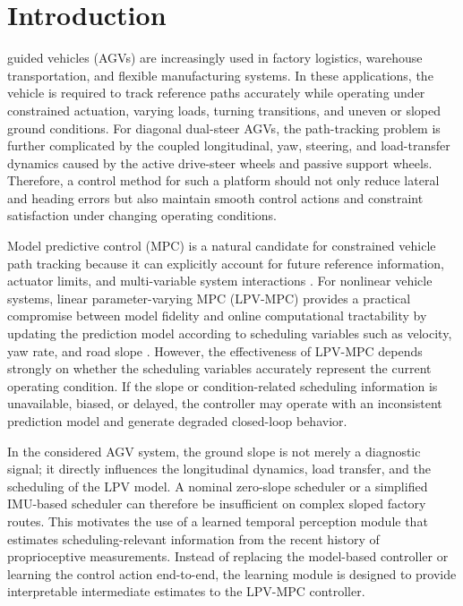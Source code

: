 \documentclass{ieeeaccess}
\begin{document}
\titlepgskip=-15pt
\maketitle

\section{Introduction}

\label{sec:introduction}

 guided vehicles (AGVs) are increasingly used in factory logistics, warehouse transportation, and flexible manufacturing systems. In these applications, the vehicle is required to track reference paths accurately while operating under constrained actuation, varying loads, turning transitions, and uneven or sloped ground conditions. For diagonal dual-steer AGVs, the path-tracking problem is further complicated by the coupled longitudinal, yaw, steering, and load-transfer dynamics caused by the active drive-steer wheels and passive support wheels. Therefore, a control method for such a platform should not only reduce lateral and heading errors but also maintain smooth control actions and constraint satisfaction under changing operating conditions.

Model predictive control (MPC) is a natural candidate for constrained vehicle path tracking because it can explicitly account for future reference information, actuator limits, and multi-variable system interactions \cite{Stano2023MPCPathTrackingReview}. For nonlinear vehicle systems, linear parameter-varying MPC (LPV-MPC) provides a practical compromise between model fidelity and online computational tractability by updating the prediction model according to scheduling variables such as velocity, yaw rate, and road slope \cite{Alcala2020LPVMPC}. However, the effectiveness of LPV-MPC depends strongly on whether the scheduling variables accurately represent the current operating condition. If the slope or condition-related scheduling information is unavailable, biased, or delayed, the controller may operate with an inconsistent prediction model and generate degraded closed-loop behavior.

In the considered AGV system, the ground slope is not merely a diagnostic signal; it directly influences the longitudinal dynamics, load transfer, and the scheduling of the LPV model. A nominal zero-slope scheduler or a simplified IMU-based scheduler can therefore be insufficient on complex sloped factory routes. This motivates the use of a learned temporal perception module that estimates scheduling-relevant information from the recent history of proprioceptive measurements. Instead of replacing the model-based controller or learning the control action end-to-end, the learning module is designed to provide interpretable intermediate estimates to the LPV-MPC controller.
\end{document}
